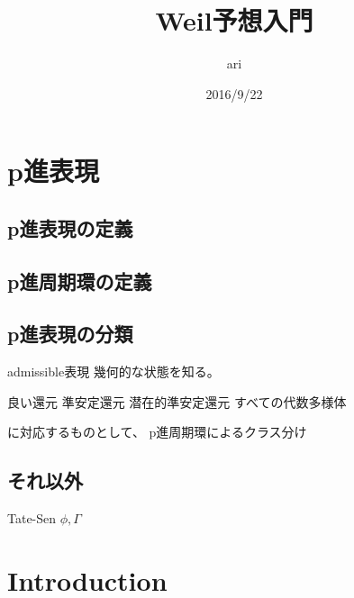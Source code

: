 \documentclass{ujarticle}
\title{Weil予想入門}
\author{ari}
\date{2016/9/22}
\begin{document}
\maketitle
\tableofcontents


\section{p進表現}
\label{sec:p進表現}

\subsection{p進表現の定義}
\label{sub:p進表現の定義}

\subsection{p進周期環の定義}
\label{sub:p進周期環}

\subsection{p進表現の分類}
\label{sub:p進表現の分類}

admissible表現
幾何的な状態を知る。

良い還元
準安定還元
潜在的準安定還元
すべての代数多様体

に対応するものとして、
p進周期環によるクラス分け

\subsection{それ以外}
\label{sub:それ以外}

Tate-Sen
$\phi,\Gamma$

\section{Introduction}
\label{sec:Introduction}
\end{document}
